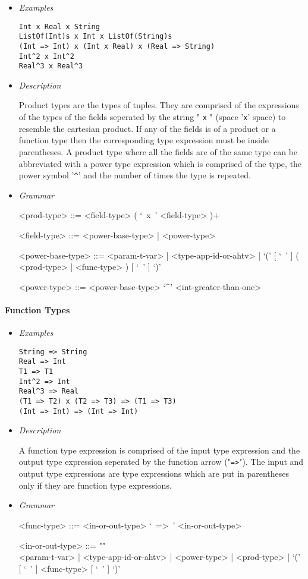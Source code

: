 \documentclass{article}
\begin{document}
\begin{itemize}
\item \textit{Examples}
\begin{verbatim}
Int x Real x String
ListOf(Int)s x Int x ListOf(String)s
(Int => Int) x (Int x Real) x (Real => String)
Int^2 x Int^2
Real^3 x Real^3
\end{verbatim}

\item \textit{Description}

Product types are the types of tuples. They are comprised of the expressions of
the types of the fields seperated by the string " \verb|x| " (space '\verb|x|'
space) to resemble the cartesian product. If any of the fields is of a product
or a function type then the corresponding type expression must be inside
parentheses. A product type where all the fields are of the same type can be
abbreviated with a power type expression which is comprised of the type, the
power symbol '\verb|^|' and the number of times the type is repeated.

\item \textit{Grammar}
\begin{grammar}
<prod-type> ::= <field-type> ( `\ x\ ' <field-type> )+

<field-type> ::= <power-base-type> | <power-type>

<power-base-type> ::=
<param-t-var> | <type-app-id-or-ahtv> |
`(' [ `\ ' ] ( <prod-type> | <func-type> ) [ `\ ' ] `)'

<power-type> ::= <power-base-type> `^' <int-greater-than-one>
\end{grammar}
\end{itemize}

\paragraph{Function Types}

\begin{itemize}
\item \textit{Examples}
\begin{verbatim}
String => String
Real => Int
T1 => T1
Int^2 => Int
Real^3 => Real
(T1 => T2) x (T2 => T3) => (T1 => T3)
(Int => Int) => (Int => Int)
\end{verbatim}

\item \textit{Description}

A function type expression is comprised of the input type expression and the
output type expression seperated by the function arrow ("\verb|=>|"). The
input and output type expressions are type expressions which are put in
parentheses only if they are function type expressions.

\item \textit{Grammar}
\begin{grammar}
<func-type> ::= <in-or-out-type> `\ =>\ ' <in-or-out-type>

<in-or-out-type> ::=
""\\
<param-t-var> | <type-app-id-or-ahtv> | <power-type> | <prod-type> |
`(' [ `\ ' ] <func-type>  [ `\ ' ] `)'
\end{grammar}
\end{itemize}
\end{document}
